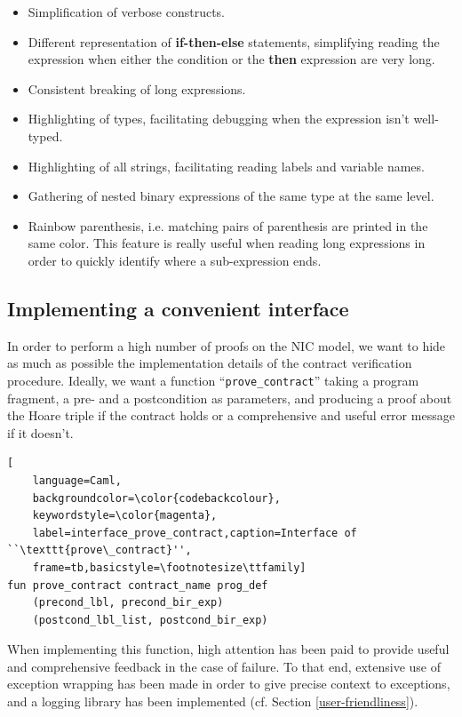 \documentclass[10pt,a4paper]{article}
\begin{document}
\begin{multicols}{2}
\begin{itemize}
    \item Simplification of verbose constructs.
    \item Different representation of \textbf{if-then-else} statements, simplifying reading the expression when either the condition or the \textbf{then} expression are very long.
    \item Consistent breaking of long expressions.
    \item Highlighting of types, facilitating debugging when the expression isn't well-typed.
    \item Highlighting of all strings, facilitating reading labels and variable names.
    \item Gathering of nested binary expressions of the same type at the same level.
    \item Rainbow parenthesis, i.e. matching pairs of parenthesis are printed in the same color. This feature is really useful when reading long expressions in order to quickly identify where a sub-expression ends.
\end{itemize}

\subsection{Implementing a convenient interface} \label{impl_convenient_ht_interface}

In order to perform a high number of proofs on the {NIC} model, we want to hide as much as possible the implementation details of the contract verification procedure. Ideally, we want a function ``\texttt{prove\_contract}'' taking a program fragment, a pre- and a postcondition as parameters, and producing a proof about the Hoare triple if the contract holds or a comprehensive and useful error message if it doesn't.
%
\begin{lstlisting}[
    language=Caml,
    backgroundcolor=\color{codebackcolour},
    keywordstyle=\color{magenta},
    label=interface_prove_contract,caption=Interface of ``\texttt{prove\_contract}'',
    frame=tb,basicstyle=\footnotesize\ttfamily]
fun prove_contract contract_name prog_def
    (precond_lbl, precond_bir_exp)
    (postcond_lbl_list, postcond_bir_exp)
\end{lstlisting}

When implementing this function, high attention has been paid to provide useful and comprehensive feedback in the case of failure. To that end, extensive use of exception wrapping has been made in order to give precise context to exceptions, and a logging library has been implemented (cf. Section \ref{user-friendliness}).


\end{multicols}
\end{document}
